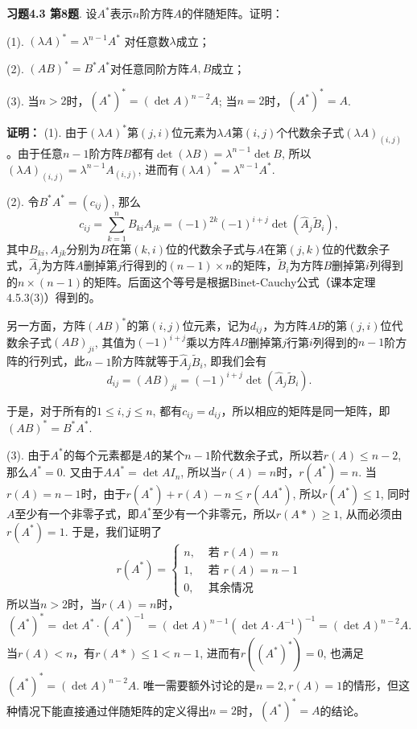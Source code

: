 
\renewcommand{\newpageorvspace}{\vspace{2em}}

\date{2021-11-26  第五次习题课}



\maketitle

{\bf 习题4.3 第8题}. 设$A^*$表示$n$阶方阵$A$的伴随矩阵。证明：

(1). $(\lambda A)^* = \lambda^{n-1}A^*$ 对任意数$\lambda$成立；

(2). $(AB)^* = B^*A^*$对任意同阶方阵$A,B$成立；

(3). 当$n > 2$时，$(A^*)^* = (\det A)^{n-2}A$; 当$n = 2$时，$(A^*)^* = A$.

{\bf 证明：} (1). 由于$(\lambda A)^*$第$(j,i)$位元素为$\lambda A$第$(i,j)$个代数余子式$(\lambda A)_{(i,j)}$。由于任意$n-1$阶方阵$B$都有$\det(\lambda B) = \lambda^{n-1}\det B$, 所以$(\lambda A)_{(i,j)} = \lambda^{n-1} A_{(i,j)}$, 进而有$(\lambda A)^* = \lambda^{n-1}A^*$.

(2). 令$B^*A^* = (c_{ij})$, 那么
$$c_{ij} = \sum\limits_{k=1}^n B_{ki} A_{jk} = (-1)^{2k}(-1)^{i+j} \det(\widehat{A}_j \widetilde{B}_i),$$
其中$B_{ki}, A_{jk}$分别为$B$在第$(k,i)$位的代数余子式与$A$在第$(j,k)$位的代数余子式，$\widehat{A}_j$为方阵$A$删掉第$j$行得到的$(n-1)\times n$的矩阵，$\widetilde{B}_i$为方阵$B$删掉第$i$列得到的$n\times (n-1)$的矩阵。后面这个等号是根据Binet-Cauchy公式（课本定理4.5.3(3)）得到的。

另一方面，方阵$(AB)^*$的第$(i,j)$位元素，记为$d_{ij}$，为方阵$AB$的第$(j,i)$位代数余子式$(AB)_{ji}$, 其值为$(-1)^{i+j}$乘以方阵$AB$删掉第$j$行第$i$列得到的$n-1$阶方阵的行列式，此$n-1$阶方阵就等于$\widehat{A}_j \widetilde{B}_i$, 即我们会有
$$d_{ij} = (AB)_{ji} = (-1)^{i+j} \det(\widehat{A}_j \widetilde{B}_i).$$

于是，对于所有的$1\leqslant i,j \leqslant n$, 都有$c_{ij} = d_{ij}$，所以相应的矩阵是同一矩阵，即$(AB)^* = B^*A^*$.

(3). 由于$A^*$的每个元素都是$A$的某个$n-1$阶代数余子式，所以若$r(A)\leqslant n-2$, 那么$A^* = 0$. 又由于$AA^* = \det A I_n$, 所以当$r(A) = n$时，$r(A^*) = n$. 当$r(A) = n-1$时，由于$r(A^*) + r(A) - n \leqslant r(AA^*)$, 所以$r(A^*) \leqslant 1$, 同时$A$至少有一个非零子式，即$A^*$至少有一个非零元，所以$r(A*) \geqslant 1$, 从而必须由$r(A^*) = 1$. 于是，我们证明了
$$r(A^*) = \begin{cases} n, & \text{ 若 } r(A) = n \\ 1, & \text{ 若 } r(A) = n-1 \\ 0, & \text{ 其余情况} \end{cases}$$
所以当$n > 2$时，当$r(A) = n$时，
$$(A^*)^* = \det A^* \cdot (A^*)^{-1} = (\det A)^{n-1} (\det A \cdot A^{-1})^{-1} = (\det A)^{n-2} A.$$
当$r(A) < n$，有$r(A*) \leqslant 1 < n-1$, 进而有$r((A^*)^*) = 0$, 也满足$(A^*)^* = (\det A)^{n-2}A$. 唯一需要额外讨论的是$n=2, r(A) = 1$的情形，但这种情况下能直接通过伴随矩阵的定义得出$n = 2$时，$(A^*)^* = A$的结论。


